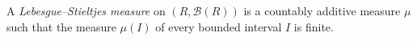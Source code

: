 A \textit{Lebesgue--Stieltjes measure} on $(R, \mathcal{B}(R))$ is a countably additive measure $\mu$ such that the measure $\mu(I)$ of every bounded interval $I$ is finite.

